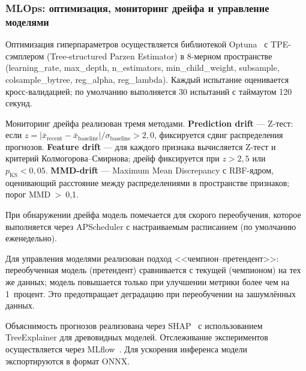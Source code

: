 \subsubsection{MLOps: оптимизация, мониторинг дрейфа и управление моделями}

Оптимизация гиперпараметров осуществляется библиотекой Optuna~\cite{Optuna} с TPE-сэмплером (Tree-structured Parzen Estimator) в 8-мерном пространстве (learning\_rate, max\_depth, n\_estimators, min\_child\_weight, subsample, colsample\_bytree, reg\_alpha, reg\_lambda). Каждый испытание оценивается кросс-валидацией; по умолчанию выполняется 30 испытаний с таймаутом 120 секунд.

Мониторинг дрейфа реализован тремя методами. \textbf{Prediction drift} --- Z-тест: если $z = |\bar{x}_{\text{recent}} - \bar{x}_{\text{baseline}}| / \sigma_{\text{baseline}} > 2{,}0$, фиксируется сдвиг распределения прогнозов. \textbf{Feature drift} --- для каждого признака вычисляется Z-тест и критерий Колмогорова--Смирнова; дрейф фиксируется при $z > 2{,}5$ или $p_{\text{KS}} < 0{,}05$. \textbf{MMD-drift} --- Maximum Mean Discrepancy с RBF-ядром, оценивающий расстояние между распределениями в пространстве признаков; порог MMD~>~0{,}1.

При обнаружении дрейфа модель помечается для скорого переобучения, которое выполняется через APScheduler с настраиваемым расписанием (по умолчанию еженедельно).

Для управления моделями реализован подход <<чемпион--претендент>>: переобученная модель (претендент) сравнивается с текущей (чемпионом) на тех же данных; модель повышается только при улучшении метрики более чем на 1~процент. Это предотвращает деградацию при переобучении на зашумлённых данных.

Объяснимость прогнозов реализована через SHAP~\cite{SHAP} с использованием TreeExplainer для древовидных моделей. Отслеживание экспериментов осуществляется через MLflow~\cite{MLflow}. Для ускорения инференса модели экспортируются в формат ONNX.
